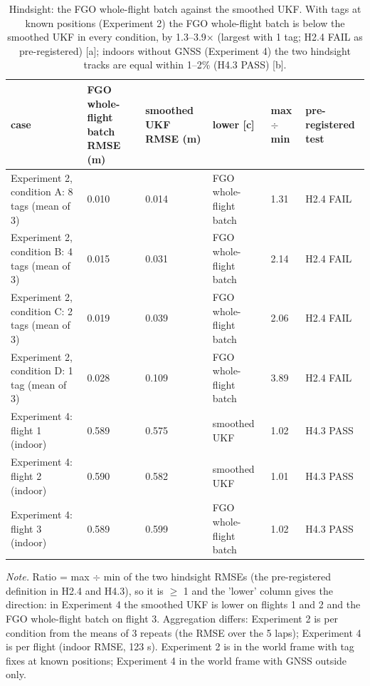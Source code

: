 \begin{table}[htbp]
\centering
\footnotesize
\caption{Hindsight: the FGO whole-flight batch against the smoothed UKF. With tags at known positions (Experiment 2) the FGO whole-flight batch is below the smoothed UKF in every condition, by 1.3--3.9$\times$ (largest with 1 tag; H2.4 FAIL as pre-registered) [a]; indoors without GNSS (Experiment 4) the two hindsight tracks are equal within 1--2\% (H4.3 PASS) [b].}
\label{tab:T8}
\begin{tabular}{p{}p{}p{}p{}p{}p{}}
\toprule
\textbf{case} & \textbf{FGO whole-flight batch RMSE (m)} & \textbf{smoothed UKF RMSE (m)} & \textbf{lower [c]} & \textbf{max $\div$ min} & \textbf{pre-registered test} \\
\midrule
Experiment 2, condition A: 8 tags (mean of 3) & 0.010 & 0.014 & FGO whole-flight batch & 1.31 & H2.4 FAIL \\
Experiment 2, condition B: 4 tags (mean of 3) & 0.015 & 0.031 & FGO whole-flight batch & 2.14 & H2.4 FAIL \\
Experiment 2, condition C: 2 tags (mean of 3) & 0.019 & 0.039 & FGO whole-flight batch & 2.06 & H2.4 FAIL \\
Experiment 2, condition D: 1 tag (mean of 3) & 0.028 & 0.109 & FGO whole-flight batch & 3.89 & H2.4 FAIL \\
Experiment 4: flight 1 (indoor) & 0.589 & 0.575 & smoothed UKF & 1.02 & H4.3 PASS \\
Experiment 4: flight 2 (indoor) & 0.590 & 0.582 & smoothed UKF & 1.01 & H4.3 PASS \\
Experiment 4: flight 3 (indoor) & 0.589 & 0.599 & FGO whole-flight batch & 1.02 & H4.3 PASS \\
\bottomrule
\end{tabular}
\par\smallskip\raggedright
\textit{Note.} Ratio = max $\div$ min of the two hindsight RMSEs (the pre-registered definition in H2.4 and H4.3), so it is $\ge$ 1 and the 'lower' column gives the direction: in Experiment 4 the smoothed UKF is lower on flights 1 and 2 and the FGO whole-flight batch on flight 3. Aggregation differs: Experiment 2 is per condition from the means of 3 repeats (the RMSE over the 5 laps); Experiment 4 is per flight (indoor RMSE, 123 s). Experiment 2 is in the world frame with tag fixes at known positions; Experiment 4 in the world frame with GNSS outside only.\par

\end{table}
